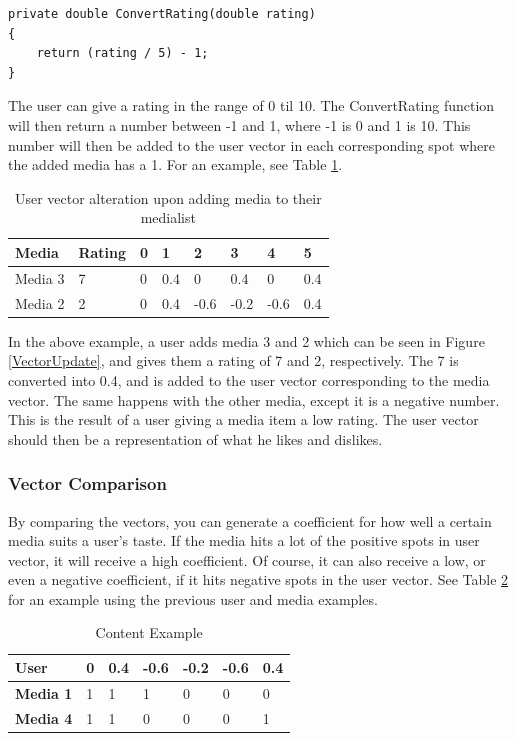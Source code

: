 \begin{lstlisting}[caption={The CompareUserPair method of the recommendation algorithm},label={ConvertRating}]
private double ConvertRating(double rating)
{
	return (rating / 5) - 1;
}
\end{lstlisting}

The user can give a rating in the range of 0 til 10. The ConvertRating function will then return a number between -1 and 1, where -1 is 0 and 1 is 10. This number will then be added to the user vector in each corresponding spot where the added media has a 1. For an example, see Table \ref{AddMediaEx}.

\begin{table}[htb]
\centering
\begin{tabular}{|l|l|l|l|l|l|l|l|} \hline
	\textbf{Media} & \textbf{Rating} & \textbf{0} & \textbf{1} & \textbf{2} & \textbf{3} & \textbf{4} & \textbf{5} \\ \hline
	Media 3 & 7 & 0 & 0.4 & 0 & 0.4 & 0 & 0.4 \\ \hline
	Media 2 & 2 & 0 & 0.4 & -0.6 & -0.2 & -0.6 & 0.4 \\ \hline
\end{tabular}
\caption{User vector alteration upon adding media to their medialist}
\label{AddMediaEx}
\end{table}

In the above example, a user adds media 3 and 2 which can be seen in Figure \ref{VectorUpdate}, and gives them a rating of 7 and 2, respectively. The 7 is converted into 0.4, and is added to the user vector corresponding to the media vector. The same happens with the other media, except it is a negative number. This is the result of a user giving a media item a low rating. The user vector should then be a representation of what he likes and dislikes.

\subsubsection{Vector Comparison}

By comparing the vectors, you can generate a coefficient for how well a certain media suits a user's taste. If the media hits a lot of the positive spots in user vector, it will receive a high coefficient. Of course, it can also receive a low, or even a negative coefficient, if it hits negative spots in the user vector. See Table \ref{ContentEx} for an example using the previous user and media examples.

\begin{table}[htb]
\centering
\begin{tabular}{|l|l|l|l|l|l|l|} \hline
	\textbf{User} & 0 & 0.4 & -0.6 & -0.2 & -0.6 & 0.4 \\ \hline
	\textbf{Media 1} & 1 & 1 & 1 & 0 & 0 & 0 \\ \hline
	\textbf{Media 4} & 1 & 1 & 0 & 0 & 0 & 1 \\ \hline
\end{tabular}
\caption{Content Example}
\label{ContentEx}
\end{table}

